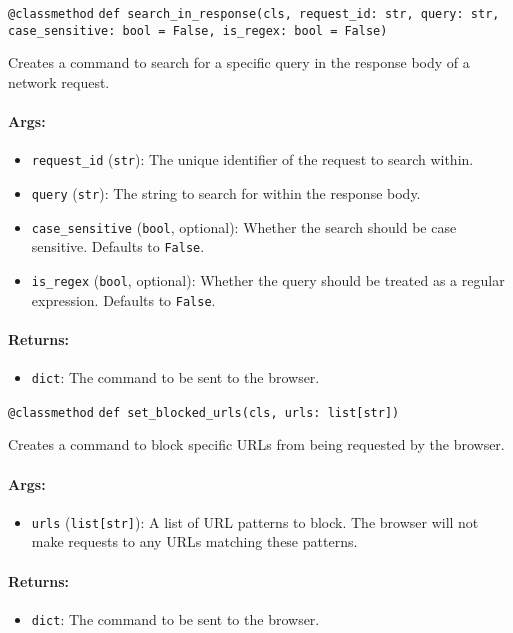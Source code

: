 \documentclass{article}
\begin{document}
\noindent\texttt{@classmethod}
\noindent\texttt{def search\_in\_response(cls, request\_id: str, query: str, case\_sensitive: bool = False, is\_regex: bool = False)}

\noindent Creates a command to search for a specific query in the response body of a network request.

\paragraph{Args:}
\begin{itemize}
    \item \texttt{request\_id} (\texttt{str}): The unique identifier of the request to search within.
    \item \texttt{query} (\texttt{str}): The string to search for within the response body.
    \item \texttt{case\_sensitive} (\texttt{bool}, optional): Whether the search should be case sensitive. Defaults to \texttt{False}.
    \item \texttt{is\_regex} (\texttt{bool}, optional): Whether the query should be treated as a regular expression. Defaults to \texttt{False}.
\end{itemize}

\paragraph{Returns:}
\begin{itemize}
    \item \texttt{dict}: The command to be sent to the browser.
\end{itemize}

\noindent\texttt{@classmethod}
\noindent\texttt{def set\_blocked\_urls(cls, urls: list[str])}

\noindent Creates a command to block specific URLs from being requested by the browser.

\paragraph{Args:}
\begin{itemize}
    \item \texttt{urls} (\texttt{list[str]}): A list of URL patterns to block. The browser will not make requests to any URLs matching these patterns.
\end{itemize}

\paragraph{Returns:}
\begin{itemize}
    \item \texttt{dict}: The command to be sent to the browser.
\end{itemize}
\end{document}
